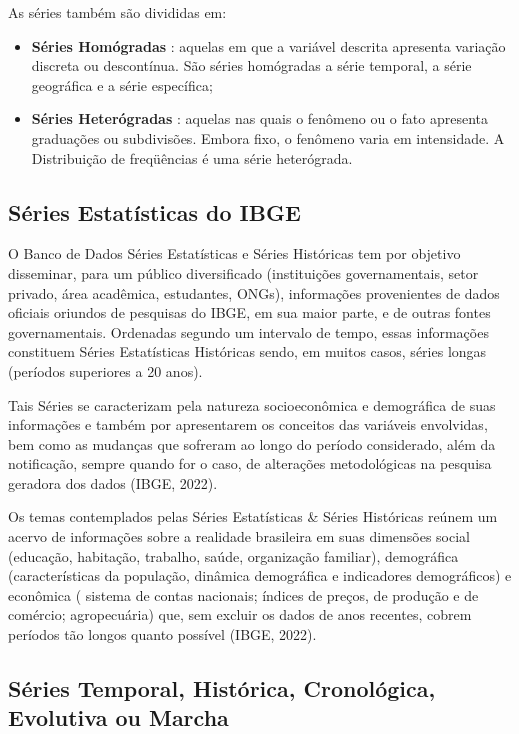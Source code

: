 As séries também são divididas em:


\begin{itemize}
  \item \textbf{Séries Homógradas} : aquelas em que a variável descrita apresenta variação discreta ou descontínua. São séries homógradas a série temporal, a série geográfica e a série específica;
 \item \textbf{Séries Heterógradas} : aquelas nas quais o fenômeno ou o fato apresenta graduações ou subdivisões. Embora fixo, o fenômeno varia em intensidade. A Distribuição de freqüências é uma série heterógrada.
\end{itemize}

\subsection{Séries Estatísticas do IBGE}

O Banco de Dados Séries Estatísticas e Séries Históricas tem por objetivo disseminar, para um público diversificado (instituições governamentais, setor privado, área acadêmica, estudantes, ONGs), informações provenientes de dados oficiais oriundos de pesquisas do IBGE, em sua maior parte, e de outras fontes governamentais. Ordenadas segundo um intervalo de tempo, essas informações constituem Séries Estatísticas Históricas sendo, em muitos casos, séries longas (períodos superiores a 20 anos). \vskip0.3cm

Tais Séries se caracterizam pela natureza socioeconômica e demográfica de suas informações e também por apresentarem os conceitos das variáveis envolvidas, bem como as mudanças que sofreram ao longo do período considerado, além da notificação, sempre quando for o caso, de alterações metodológicas na pesquisa geradora dos dados (IBGE, 2022).\vskip0.3cm

Os temas contemplados pelas Séries Estatísticas \& Séries Históricas reúnem um acervo de informações sobre a realidade brasileira em suas dimensões social (educação, habitação, trabalho, saúde, organização familiar), demográfica (características da população, dinâmica demográfica e indicadores demográficos) e econômica ( sistema de contas nacionais; índices de preços, de produção e de comércio; agropecuária) que, sem excluir os dados de anos recentes, cobrem períodos tão longos quanto possível (IBGE, 2022).





\newpage 
\subsection{Séries Temporal, Histórica, Cronológica, Evolutiva ou Marcha}

